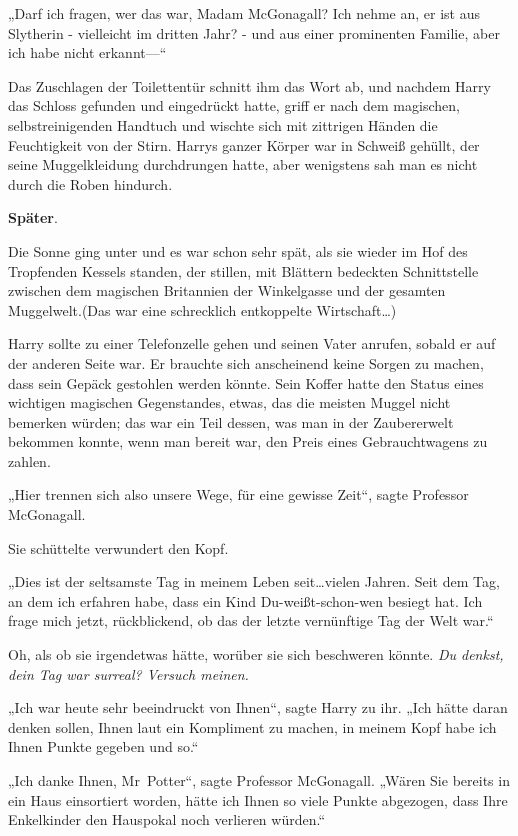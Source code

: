 {„Darf ich fragen, wer das war, Madam McGonagall? Ich nehme an, er ist aus Slytherin - vielleicht im dritten Jahr? - und aus einer prominenten Familie, aber ich habe nicht erkannt—“

Das Zuschlagen der Toilettentür schnitt ihm das Wort ab, und nachdem Harry das Schloss gefunden und eingedrückt hatte, griff er nach dem magischen, selbstreinigenden Handtuch und wischte sich mit zittrigen Händen die Feuchtigkeit von der Stirn. Harrys ganzer Körper war in Schweiß gehüllt, der seine Muggelkleidung durchdrungen hatte, aber wenigstens sah man es nicht durch die Roben hindurch.

\textbf{Später}.

Die Sonne ging unter und es war schon sehr spät, als sie wieder im Hof des Tropfenden Kessels standen, der stillen, mit Blättern bedeckten Schnittstelle zwischen dem magischen Britannien der Winkelgasse und der gesamten Muggelwelt.(Das war eine schrecklich entkoppelte Wirtschaft…)

Harry sollte zu einer Telefonzelle gehen und seinen Vater anrufen, sobald er auf der anderen Seite war. Er brauchte sich anscheinend keine Sorgen zu machen, dass sein Gepäck gestohlen werden könnte. Sein Koffer hatte den Status eines wichtigen magischen Gegenstandes, etwas, das die meisten Muggel nicht bemerken würden; das war ein Teil dessen, was man in der Zaubererwelt bekommen konnte, wenn man bereit war, den Preis eines Gebrauchtwagens zu zahlen.

„Hier trennen sich also unsere Wege, für eine gewisse Zeit“, sagte Professor McGonagall.

Sie schüttelte verwundert den Kopf.

„Dies ist der seltsamste Tag in meinem Leben seit…vielen Jahren. Seit dem Tag, an dem ich erfahren habe, dass ein Kind Du-weißt-schon-wen besiegt hat. Ich frage mich jetzt, rückblickend, ob das der letzte vernünftige Tag der Welt war.“

Oh, als ob sie irgendetwas hätte, worüber sie sich beschweren könnte. \emph{Du denkst, dein Tag war surreal? Versuch meinen.}

„Ich war heute sehr beeindruckt von Ihnen“, sagte Harry zu ihr. „Ich hätte daran denken sollen, Ihnen laut ein Kompliment zu machen, in meinem Kopf habe ich Ihnen Punkte gegeben und so.“

„Ich danke Ihnen, Mr~Potter“, sagte Professor McGonagall. „Wären Sie bereits in ein Haus einsortiert worden, hätte ich Ihnen so viele Punkte abgezogen, dass Ihre Enkelkinder den Hauspokal noch verlieren würden.“

}
